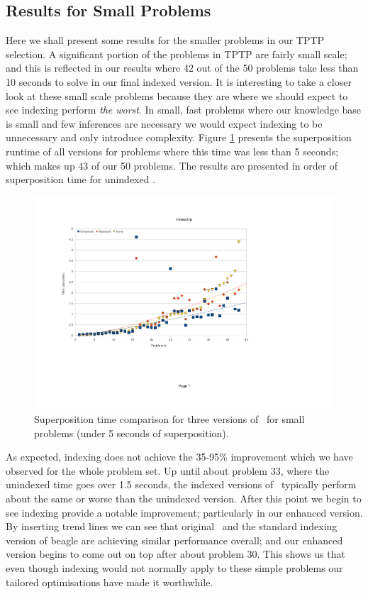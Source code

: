 \subsection{Results for Small Problems}
\label{sec:small}

Here we shall present some results for the smaller problems in our TPTP selection.
A significant portion of the problems in TPTP are fairly small scale; and this
is reflected in our results where 42 out of the 50 problems take less than
10 seconds to solve in our final indexed version. It is interesting to take a
closer look at these small scale problems because they are where we should expect to see
indexing perform \emph{the worst}. In small, fast problems where our knowledge base is small
and few inferences are necessary we would expect indexing to be unnecessary and
only introduce complexity. Figure \ref{fig:worst} presents the superposition runtime
of all versions for problems where this time was less than 5 seconds; which makes up 43
of our 50 problems. The results
are presented in order of superposition time for unindexed \beagle.

\begin{figure}[h]
  \includegraphics[trim=2.45cm 6cm 8cm 3cm,clip,width=\textwidth]{resources/suptimetrends}
  \caption{Superposition time comparison for three versions of \beagle\ for small problems
  (under 5 seconds of superposition).}
  \label{fig:worst}
\end{figure}

As expected, indexing does not achieve the 35-95\% improvement which
we have observed for the whole problem set. Up until about problem 33, where
the unindexed time goes over 1.5 seconds, the indexed versions of \beagle\ typically
perform about the same or worse than the unindexed version. After this point we
begin to see indexing provide a notable improvement; particularly in our enhanced
version. By inserting trend lines we can see that original \beagle\ and the standard
indexing version of beagle are achieving similar performance overall; and our enhanced
version begins to come out on top after about problem 30. This shows us that
even though indexing would not normally apply to these simple problems our tailored
optimisations have made it worthwhile.

